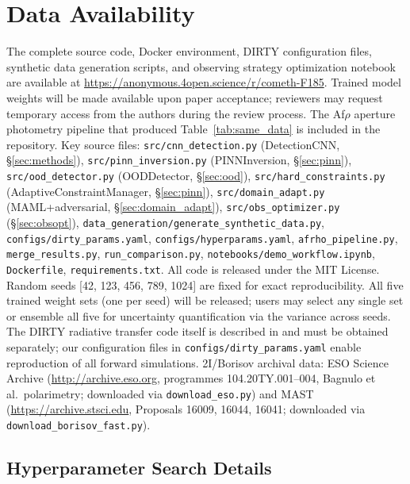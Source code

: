 \documentclass[usenatbib]{mnras}
\begin{document}
\section*{Data Availability}\label{sec:data_availability}
The complete source code, Docker environment, DIRTY configuration files, synthetic data generation scripts, and observing strategy optimization notebook are available at \url{https://anonymous.4open.science/r/cometh-F185}. Trained model weights will be made available upon paper acceptance; reviewers may request temporary access from the authors during the review process. The Af$\rho$ aperture photometry pipeline that produced Table~\ref{tab:same_data} is included in the repository. Key source files: \texttt{src/cnn\_detection.py} (DetectionCNN, \S\ref{sec:methods}), \texttt{src/pinn\_inversion.py} (PINNInversion, \S\ref{sec:pinn}), \texttt{src/ood\_detector.py} (OODDetector, \S\ref{sec:ood}), \texttt{src/hard\_constraints.py} (AdaptiveConstraintManager, \S\ref{sec:pinn}), \texttt{src/domain\_adapt.py} (MAML+adversarial, \S\ref{sec:domain_adapt}), \texttt{src/obs\_optimizer.py} (\S\ref{sec:obsopt}), \texttt{data\_generation/generate\_synthetic\_data.py}, \texttt{configs/dirty\_params.yaml}, \texttt{configs/hyperparams.yaml}, \texttt{afrho\_pipeline.py}, \texttt{merge\_results.py}, \texttt{run\_comparison.py}, \texttt{notebooks/demo\_workflow.ipynb}, \texttt{Dockerfile}, \texttt{requirements.txt}. All code is released under the MIT License. Random seeds [42, 123, 456, 789, 1024] are fixed for exact reproducibility. All five trained weight sets (one per seed) will be released; users may select any single set or ensemble all five for uncertainty quantification via the variance across seeds. The DIRTY radiative transfer code itself is described in \citet{gordon01} and must be obtained separately; our configuration files in {\tt configs/dirty\_params.yaml} enable reproduction of all forward simulations. 2I/Borisov archival data: ESO Science Archive (\url{http://archive.eso.org}, programmes 104.20TY.001--004, Bagnulo et al.\ polarimetry; downloaded via \texttt{download\_eso.py}) and MAST (\url{https://archive.stsci.edu}, Proposals 16009, 16044, 16041; downloaded via \texttt{download\_borisov\_fast.py}).




\subsection{Hyperparameter Search Details}\label{app:hyper_search}
\end{document}
